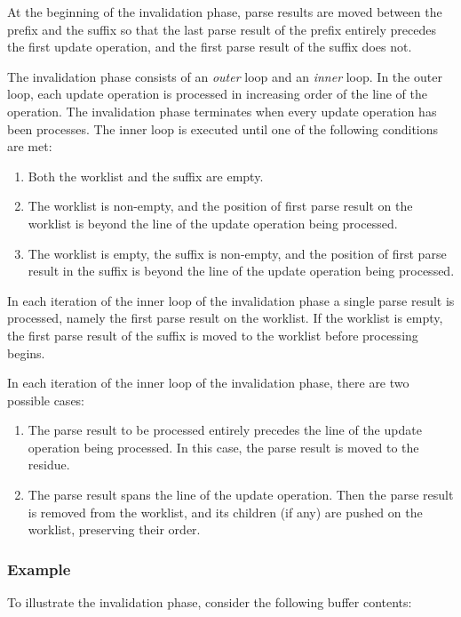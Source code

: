 At the beginning of the invalidation phase, parse results are moved
between the prefix and the suffix so that the last parse result of the
prefix entirely precedes the first update operation, and the first
parse result of the suffix does not.

The invalidation phase consists of an \emph{outer} loop and an
\emph{inner} loop.  In the outer loop, each update operation is
processed in increasing order of the line of the operation.  The
invalidation phase terminates when every update operation has been
processes.  The inner loop is executed until one of the following
conditions are met:

\begin{enumerate}
\item Both the worklist and the suffix are empty.
\item The worklist is non-empty, and the position of first parse
  result on the worklist is beyond the line of the update operation
  being processed.
\item The worklist is empty, the suffix is non-empty, and the position
  of first parse result in the suffix is beyond the line of the update
  operation being processed.
\end{enumerate}

In each iteration of the inner loop of the invalidation phase a single
parse result is processed, namely the first parse result on the
worklist.  If the worklist is empty, the first parse result of the
suffix is moved to the worklist before processing begins.

In each iteration of the inner loop of the invalidation phase, there
are two possible cases:

\begin{enumerate}
\item The parse result to be processed entirely precedes the line of
  the update operation being processed.  In this case, the parse
  result is moved to the residue.
\item The parse result spans the line of the update operation.  Then
  the parse result is removed from the worklist, and its children (if
  any) are pushed on the worklist, preserving their order.
\end{enumerate}

\subsubsection{Example}

To illustrate the invalidation phase, consider the following buffer
contents:

